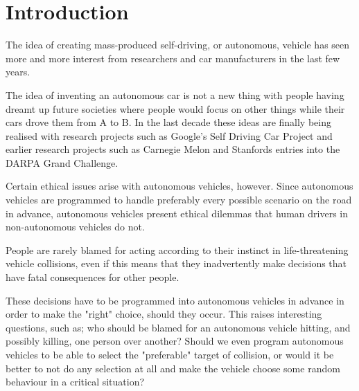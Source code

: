 \chapter{Introduction}
The idea of creating mass-produced self-driving, or autonomous, vehicle has seen more and more interest from researchers and car manufacturers in the last few years.

The idea of inventing an autonomous car is not a new thing with people having dreamt up future societies where people would focus on other things while their cars drove them from A to B. In the last decade these ideas are finally being realised with research projects such as Google's Self Driving Car Project and earlier research projects such as Carnegie Melon and Stanfords entries into the DARPA Grand Challenge.  

\newpar Certain ethical issues arise with autonomous vehicles, however. Since autonomous vehicles are programmed to handle preferably every possible scenario on the road in advance, autonomous vehicles present ethical dilemmas that human drivers in non-autonomous vehicles do not. 

\newpar People are rarely blamed for acting according to their instinct in life-threatening vehicle collisions, even if this means that they inadvertently make decisions that have fatal consequences for other people. 

These decisions have to be programmed into autonomous vehicles in advance in order to make the "right" choice, should they occur. 
This raises interesting questions, such as; who should be blamed for an autonomous vehicle hitting, and possibly killing, one person over another? Should we even program autonomous vehicles to be able to select the "preferable" target of collision, or would it be better to not do any selection at all and make the vehicle choose some random behaviour in a critical situation?   

